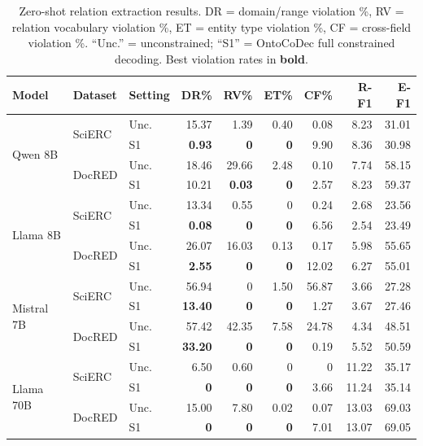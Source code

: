 \documentclass[11pt]{article}
\newcommand{\sys}{OntoCoDec}
\begin{document}
\begin{table}[t]
\centering
\caption{Zero-shot relation extraction results. DR = domain/range violation \%, RV = relation vocabulary violation \%, ET = entity type violation \%, CF = cross-field violation \%. ``Unc.'' = unconstrained; ``S1'' = \sys{} full constrained decoding. Best violation rates in \textbf{bold}.}
\label{tab:re_zs}
\small
\begin{tabular}{ll l rrrr rr}
\toprule
\textbf{Model} & \textbf{Dataset} & \textbf{Setting} & \textbf{DR\%} & \textbf{RV\%} & \textbf{ET\%} & \textbf{CF\%} & \textbf{R-F1} & \textbf{E-F1} \\
\midrule
\multirow{4}{*}{Qwen 8B}
 & \multirow{2}{*}{SciERC} & Unc. & 15.37 & 1.39 & 0.40 & 0.08 & 8.23 & 31.01 \\
 & & S1 & \textbf{0.93} & \textbf{0} & \textbf{0} & 9.90 & 8.36 & 30.98 \\
\cmidrule{2-9}
 & \multirow{2}{*}{DocRED} & Unc. & 18.46 & 29.66 & 2.48 & 0.10 & 7.74 & 58.15 \\
 & & S1 & 10.21 & \textbf{0.03} & \textbf{0} & 2.57 & 8.23 & 59.37 \\
\midrule
\multirow{4}{*}{Llama 8B}
 & \multirow{2}{*}{SciERC} & Unc. & 13.34 & 0.55 & 0 & 0.24 & 2.68 & 23.56 \\
 & & S1 & \textbf{0.08} & \textbf{0} & \textbf{0} & 6.56 & 2.54 & 23.49 \\
\cmidrule{2-9}
 & \multirow{2}{*}{DocRED} & Unc. & 26.07 & 16.03 & 0.13 & 0.17 & 5.98 & 55.65 \\
 & & S1 & \textbf{2.55} & \textbf{0} & \textbf{0} & 12.02 & 6.27 & 55.01 \\
\midrule
\multirow{4}{*}{Mistral 7B}
 & \multirow{2}{*}{SciERC} & Unc. & 56.94 & 0 & 1.50 & 56.87 & 3.66 & 27.28 \\
 & & S1 & \textbf{13.40} & \textbf{0} & \textbf{0} & 1.27 & 3.67 & 27.46 \\
\cmidrule{2-9}
 & \multirow{2}{*}{DocRED} & Unc. & 57.42 & 42.35 & 7.58 & 24.78 & 4.34 & 48.51 \\
 & & S1 & \textbf{33.20} & \textbf{0} & \textbf{0} & 0.19 & 5.52 & 50.59 \\
\midrule
\multirow{4}{*}{Llama 70B}
 & \multirow{2}{*}{SciERC} & Unc. & 6.50 & 0.60 & 0 & 0 & 11.22 & 35.17 \\
 & & S1 & \textbf{0} & \textbf{0} & \textbf{0} & 3.66 & 11.24 & 35.14 \\
\cmidrule{2-9}
 & \multirow{2}{*}{DocRED} & Unc. & 15.00 & 7.80 & 0.02 & 0.07 & 13.03 & 69.03 \\
 & & S1 & \textbf{0} & \textbf{0} & \textbf{0} & 7.01 & 13.07 & 69.05 \\
\bottomrule
\end{tabular}
\end{table}
\end{document}
